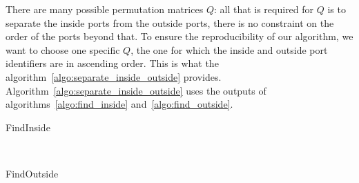 There are many possible permutation matrices $Q$: all that is required for $Q$ is to separate the inside ports from the outside ports, there is no constraint on the order of the ports beyond that.
To ensure the reproducibility of our algorithm, we want to choose one specific $Q$, the one for which the inside and outside port identifiers are in ascending order.
This is what the algorithm~\cref{algo:separate_inside_outside} provides.
Algorithm~\cref{algo:separate_inside_outside} uses the outputs of algorithms~\cref{algo:find_inside} and~\cref{algo:find_outside}.

\begin{algorithm}
    \caption{FindInside}
    \label{algo:find_inside}
    \begin{algorithmic}
         
        \EndFor
        \\  
        \EndFunction
    \end{algorithmic}
\end{algorithm}

\begin{algorithm}
    \caption{FindOutside}
    \label{algo:find_outside}
    \begin{algorithmic}
         
         
        \\  
        \EndFunction
    \end{algorithmic}
\end{algorithm}

